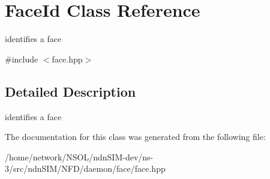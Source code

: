 \hypertarget{classFaceId}{}\section{Face\+Id Class Reference}
\label{classFaceId}


identifies a face  




{\ttfamily \#include $<$face.\+hpp$>$}



\subsection{Detailed Description}
identifies a face 

The documentation for this class was generated from the following file\+:\begin{DoxyCompactItemize}
\item 
/home/network/\+N\+S\+O\+L/ndn\+S\+I\+M-\/dev/ns-\/3/src/ndn\+S\+I\+M/\+N\+F\+D/daemon/face/face.\+hpp\end{DoxyCompactItemize}
